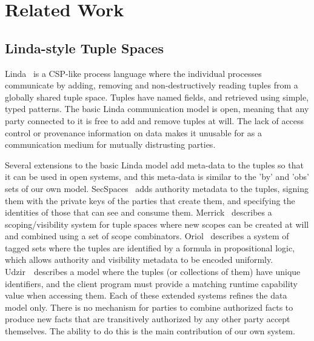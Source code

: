 

\label{s:Related}
\section{Related Work}



\subsection{Linda-style Tuple Spaces}
Linda~\cite{Gelernter1985:Linda} is a CSP-like process language where the individual processes communicate by adding, removing and non-destructively reading tuples from a globally shared tuple space. Tuples have named fields, and retrieved using simple, typed patterns. The basic Linda communication model is open, meaning that any party connected to it is free to add and remove tuples at will. The lack of access control or provenance information on data makes it unusable for as a communication medium for mutually distrusting parties.

Several extensions to the basic Linda model add meta-data to the tuples so that it can be used in open systems, and this meta-data is similar to the 'by' and 'obs' sets of our own model. SecSpaces~\cite{Busi2003:SecSpaces} adds authority metadata to the tuples, signing them with the private keys of the parties that create them, and specifying the identities of those that can see and consume them. Merrick~\cite{Merrick2000:Scopes} describes a scoping/visibility system for tuple spaces where new scopes can be created at will and combined using a set of scope combinators. Oriol~\cite{Oriol2005:TaggedSets} describes a system of tagged sets where the tuples are identified by a formula in propositional logic, which allows authority and visibility metadata to be encoded uniformly. Udzir~\cite{Udzir2007:MultiCapabilities}~describes a model where the tuples (or collections of them) have unique identifiers, and the client program must provide a matching runtime capability value when accessing them. Each of these extended systems refines the data model only. There is no mechanism for parties to combine authorized facts to produce new facts that are transitively authorized by any other party accept themselves. The ability to do this is the main contribution of our own system.


